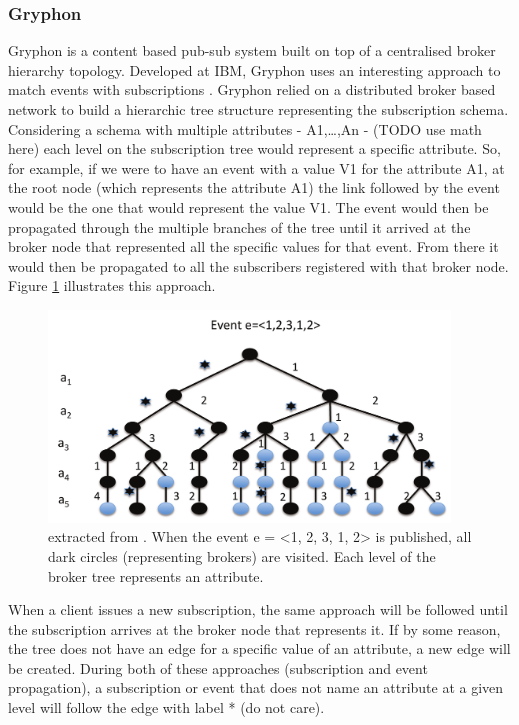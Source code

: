 \subsubsection{Gryphon}\label{gryphon}

Gryphon \cite{Strom1998} is a content based pub-sub system
built on top of a centralised broker hierarchy topology. Developed at
IBM, Gryphon uses an interesting approach to match events with
subscriptions \cite{Aguilera1999}. Gryphon relied on a distributed broker based
network to build a hierarchic tree structure representing the
subscription schema. Considering a schema with multiple attributes -
A1,\ldots{},An - (TODO use math here) each level on the subscription tree would represent a
specific attribute. So, for example, if we were to have an event with a
value V1 for the attribute A1, at the root node (which represents the
attribute A1) the link followed by the event would be the one that would
represent the value V1. The event would then be propagated through the
multiple branches of the tree until it arrived at the broker node that
represented all the specific values for that event. From there it would
then be propagated to all the subscribers registered with that broker
node. Figure \ref{fig:gryphon} illustrates this approach.

\begin{figure}[hb!]
  \centering
  \includegraphics[width=0.95\textwidth]{img/gryphon.png}
  \caption{extracted from \cite{Kermarrec2013}. When the event e = <1, 2, 3, 1, 2> is published,
  all dark circles (representing brokers) are visited.
  Each level of the broker tree represents an attribute.}
  \label{fig:gryphon}
\end{figure}

When a client issues a new subscription, the same approach will be
followed until the subscription arrives at the broker node that
represents it. If by some reason, the tree does not have an edge for a
specific value of an attribute, a new edge will be created. During both
of these approaches (subscription and event propagation), a subscription
or event that does not name an attribute at a given level will follow
the edge with label * (do not care).

